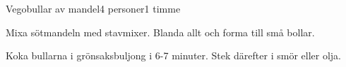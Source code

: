 \documentclass[a4wide, 10pt]{article}
\begin{document}
\begin{recipe}{Vegobullar av mandel}{4 personer}{1 timme}


Mixa sötmandeln med stavmixer. Blanda allt och forma till små bollar.


Koka bullarna i grönsaksbuljong i 6-7 minuter. Stek därefter i smör
eller olja.
\end{recipe}
\end{document}
